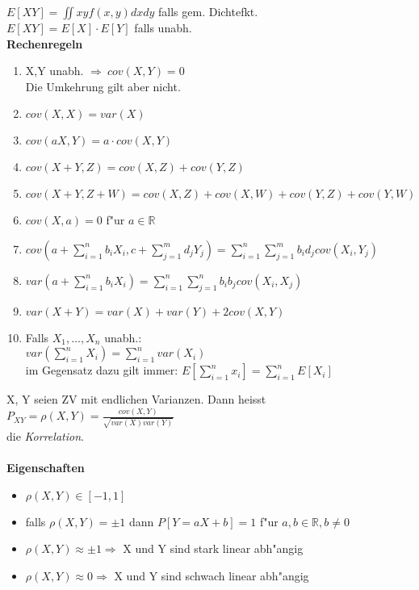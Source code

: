 \documentclass[10pt, a4paper, twocolumn]{scrartcl}
\begin{document}
$E[XY]=\iint xy f(x,y)dxdy$ falls gem. Dichtefkt.\\
$E[XY]=E[X]\cdotp E[Y]$ falls unabh.\\

\textbf{Rechenregeln}
\begin{enumerate}
 \item X,Y unabh. $\Rightarrow\: cov(X,Y)=0$\\
  Die Umkehrung gilt aber nicht.
 \item $cov(X,X)=var(X)$
 \item $cov(aX,Y)=a\cdotp cov(X,Y)$
 \item $cov(X+Y,Z)=cov(X,Z)+cov(Y,Z)$
 \item $cov(X+Y,Z+W)=cov(X,Z)+cov(X,W)+cov(Y,Z)+cov(Y,W)$
 \item $cov(X,a)=0$ f"ur $a\in\mathbb{R}$
 \item $cov(a+\sum\limits^{n}_{i=1}b_i X_i,c+\sum\limits^{m}_{j=1}d_j Y_j)=\sum\limits^{n}_{i=1}\sum\limits^{m}_{j=1}b_i d_j cov(X_i,Y_j)$
 \item $var(a+\sum\limits^{n}_{i=1}b_iX_i)=\sum\limits^{n}_{i=1}\sum\limits^{n}_{j=1}b_i b_j cov(X_i,X_j)$
 \item $var(X+Y)=var(X)+var(Y)+2cov(X,Y)$
 \item Falls $X_1,\ldots,X_n$ unabh.:\\
  $var(\sum\limits^{n}_{i=1}X_i)=\sum\limits^{n}_{i=1}var(X_i)$\\
  im Gegensatz dazu gilt immer: $E[\sum\limits^{n}_{i=1}x_i]=\sum\limits^{n}_{i=1}E[X_i]$
\end{enumerate}

X, Y seien ZV mit endlichen Varianzen. Dann heisst\\
$P_{XY}=\rho(X,Y)=\frac{cov(X,Y)}{\sqrt{var(X) var(Y)}}$\\
die \textit{Korrelation}.\\\\

\textbf{Eigenschaften}
\begin{itemize}
 \item $\rho(X,Y) \in [-1,1]$
 \item falls $\rho(X,Y)=\pm 1$ dann $P[Y=aX+b]=1$ f"ur $a,b \in \mathbb{R},b\neq 0$
 \item $\rho(X,Y)\approx\pm 1\Rightarrow$ X und Y sind stark linear abh"angig
 \item $\rho(X,Y)\approx 0\Rightarrow$ X und Y sind schwach linear abh"angig
\end{itemize}
\end{document}
